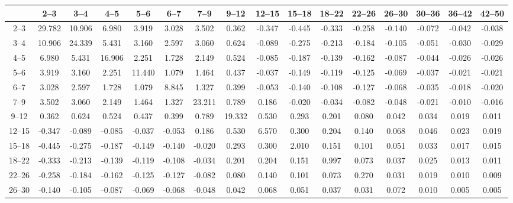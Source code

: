 \begin{table}[tb]
    {\renewcommand{\tabcolsep}{0.1cm} \begin{tabular}{c|ccccccccccccccc}
    \hline
           &   2--3 &   3--4 &   4--5 &   5--6 &   6--7 &   7--9 &  9--12 & 12--15 & 15--18 & 18--22 & 22--26 & 26--30 & 30--36 & 36--42 & 42--50 \\
    \hline
    2--3   & 29.782 & 10.906 &  6.980 &  3.919 &  3.028 &  3.502 &  0.362 & -0.347 & -0.445 & -0.333 & -0.258 & -0.140 & -0.072 & -0.042 & -0.038 \\
    3--4   & 10.906 & 24.339 &  5.431 &  3.160 &  2.597 &  3.060 &  0.624 & -0.089 & -0.275 & -0.213 & -0.184 & -0.105 & -0.051 & -0.030 & -0.029 \\
    4--5   &  6.980 &  5.431 & 16.906 &  2.251 &  1.728 &  2.149 &  0.524 & -0.085 & -0.187 & -0.139 & -0.162 & -0.087 & -0.044 & -0.026 & -0.026 \\
    5--6   &  3.919 &  3.160 &  2.251 & 11.440 &  1.079 &  1.464 &  0.437 & -0.037 & -0.149 & -0.119 & -0.125 & -0.069 & -0.037 & -0.021 & -0.021 \\
    6--7   &  3.028 &  2.597 &  1.728 &  1.079 &  8.845 &  1.327 &  0.399 & -0.053 & -0.140 & -0.108 & -0.127 & -0.068 & -0.035 & -0.018 & -0.020 \\
    7--9   &  3.502 &  3.060 &  2.149 &  1.464 &  1.327 & 23.211 &  0.789 &  0.186 & -0.020 & -0.034 & -0.082 & -0.048 & -0.021 & -0.010 & -0.016 \\
    9--12  &  0.362 &  0.624 &  0.524 &  0.437 &  0.399 &  0.789 & 19.332 &  0.530 &  0.293 &  0.201 &  0.080 &  0.042 &  0.034 &  0.019 &  0.011 \\
    12--15 & -0.347 & -0.089 & -0.085 & -0.037 & -0.053 &  0.186 &  0.530 &  6.570 &  0.300 &  0.204 &  0.140 &  0.068 &  0.046 &  0.023 &  0.019 \\
    15--18 & -0.445 & -0.275 & -0.187 & -0.149 & -0.140 & -0.020 &  0.293 &  0.300 &  2.010 &  0.151 &  0.101 &  0.051 &  0.033 &  0.017 &  0.015 \\
    18--22 & -0.333 & -0.213 & -0.139 & -0.119 & -0.108 & -0.034 &  0.201 &  0.204 &  0.151 &  0.997 &  0.073 &  0.037 &  0.025 &  0.013 &  0.011 \\
    22--26 & -0.258 & -0.184 & -0.162 & -0.125 & -0.127 & -0.082 &  0.080 &  0.140 &  0.101 &  0.073 &  0.270 &  0.031 &  0.019 &  0.010 &  0.009 \\
    26--30 & -0.140 & -0.105 & -0.087 & -0.069 & -0.068 & -0.048 &  0.042 &  0.068 &  0.051 &  0.037 &  0.031 &  0.072 &  0.010 &  0.005 &  0.005 \\

\end{tabular}}
\end{table}

